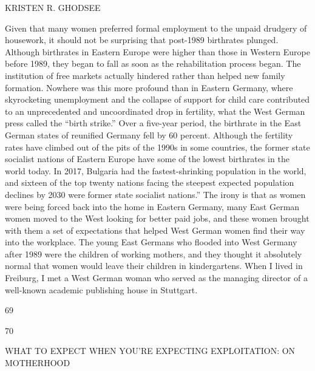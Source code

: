  \par 
KRISTEN R. GHODSEE
 \par 
Given that many women preferred formal employment to the unpaid drudgery of housework, it should not be surprising that post-1989 birthrates plunged. Although birthrates in Eastern Europe were higher than those in Western Europe before 1989, they began to fall as soon as the rehabilitation process began. The institution of free markets actually hindered rather than helped new family formation. Nowhere was this more profound than in Eastern Germany, where skyrocketing unemployment and the collapse of support for child care contributed to an unprecedented and uncoordinated drop in fertility, what the West German press called the “birth strike.” Over a five-year period, the birthrate in the East German states of reunified Germany fell by {\color{blue}60} percent. Although the fertility rates have climbed out of the pits of the 1990s in some countries, the former state socialist nations of Eastern Europe have some of the lowest birthrates in the world today. In 2017, Bulgaria had the fastest-shrinking population in the world, and sixteen of the top twenty nations facing the steepest expected population declines by 2030 were former state socialist nations.” The irony is that as women were being forced back into the home in Eastern Germany, many East German women moved to the West looking for better paid jobs, and these women brought with them a set of expectations that helped West German women find their way into the workplace. The young East Germans who flooded into West Germany after 1989 were the children of working mothers, and they thought it absolutely normal that women would leave their children in kindergartens. When I lived in Freiburg, I met a West German woman who served as the managing director of a well-known academic publishing house in Stuttgart.
 \par 
69
 \par 
70
 \par 
WHAT TO EXPECT WHEN YOU'RE EXPECTING EXPLOITATION: ON MOTHERHOOD
 \par 
